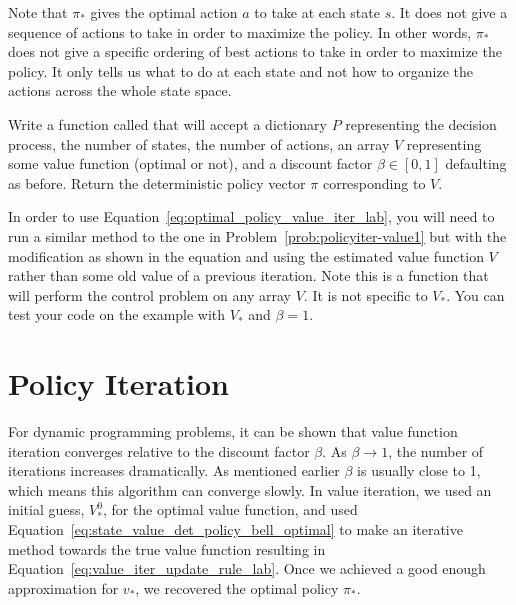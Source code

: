 \begin{info}
Note that $\pi_*$ gives the optimal action $a$ to take at each state $s$.
It does not give a sequence of actions to take in order to maximize the policy.
In other words, $\pi_*$ does not give a specific ordering of best actions to take in order to maximize the policy.
It only tells us what to do at each state and not how to organize the actions across the whole state space.
\end{info}

\begin{problem}
\label{prob:policyiter-value2}
Write a function called  that will accept a dictionary $P$ representing the decision process, the number of states, the number of actions, an array $V$ representing some value function (optimal or not), and a discount factor $\beta \in [0,1]$ defaulting as before.
Return the deterministic policy vector $\pi$ corresponding to $V$.

In order to use Equation\ \ref{eq:optimal_policy_value_iter_lab}, you will need to run a similar method to the one in Problem\ \ref{prob:policyiter-value1} but with the modification as shown in the equation and using the estimated value function $V$ rather than some old value of a previous iteration.
Note this is a function that will perform the control problem on any array $V$.
It is not specific to $V_*$.
You can test your code on the example with $V_*$ and $\beta = 1$.
\end{problem}

\section*{Policy Iteration}
For dynamic programming problems, it can be shown that value function iteration converges relative to the discount factor $\beta$.
As $\beta\rightarrow1$, the number of iterations increases dramatically.
As mentioned earlier $\beta$ is usually close to 1, which means this algorithm can converge slowly.
In value iteration, we used an initial guess, $V_*^0$, for the optimal value function, and used Equation\ \ref{eq:state_value_det_policy_bell_optimal} to make an iterative method towards the true value function resulting in Equation\ \ref{eq:value_iter_update_rule_lab}.
Once we achieved a good enough approximation for $v_*$, we recovered the optimal policy $\pi_*$.

